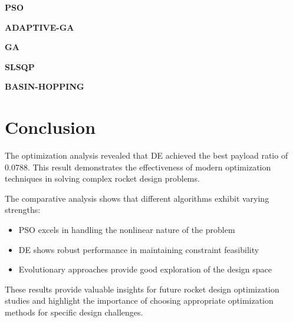\documentclass[11pt]{article}
\begin{document}
\item \textbf{PSO}
\begin{itemize}
\end{itemize}
\item \textbf{ADAPTIVE-GA}
\begin{itemize}
\end{itemize}
\item \textbf{GA}
\begin{itemize}
\end{itemize}
\item \textbf{SLSQP}
\begin{itemize}
\end{itemize}
\item \textbf{BASIN-HOPPING}
\begin{itemize}
\end{itemize}

\section{Conclusion}
The optimization analysis revealed that DE achieved the best payload ratio of 0.0788. This result demonstrates the effectiveness of modern optimization techniques in solving complex rocket design problems.

The comparative analysis shows that different algorithms exhibit varying strengths:
\begin{itemize}
    \item PSO excels in handling the nonlinear nature of the problem \cite{pso_ascent_2013}
    \item DE shows robust performance in maintaining constraint feasibility \cite{de_ascent_2021}
    \item Evolutionary approaches provide good exploration of the design space \cite{evolutionary_rocket_2022}
\end{itemize}

These results provide valuable insights for future rocket design optimization studies and highlight the importance of choosing appropriate optimization methods for specific design challenges.


\end{document}
